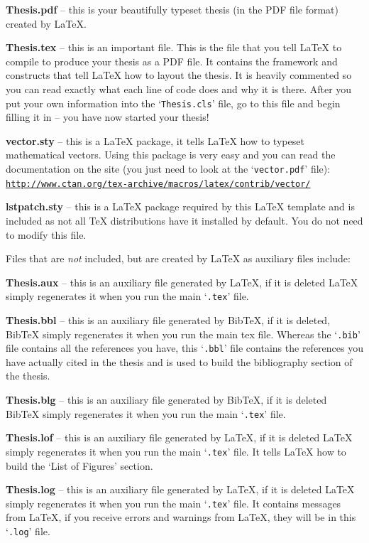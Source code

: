 \textbf{Thesis.pdf} -- this is your beautifully typeset thesis (in the PDF file format) created by \LaTeX{}.

\textbf{Thesis.tex} -- this is an important file. This is the file that you tell \LaTeX{} to compile to produce your thesis as a PDF file. It contains the framework and constructs that tell \LaTeX{} how to layout the thesis. It is heavily commented so you can read exactly what each line of code does and why it is there. After you put your own information into the `\texttt{Thesis.cls}' file, go to this file and begin filling it in -- you have now started your thesis!

\textbf{vector.sty} -- this is a \LaTeX{} package, it tells \LaTeX{} how to typeset mathematical vectors. Using this package is very easy and you can read the documentation on the site (you just need to look at the `\texttt{vector.pdf}' file):\\
\href{http://www.ctan.org/tex-archive/macros/latex/contrib/vector/}{\texttt{http://www.ctan.org/tex-archive/macros/latex/contrib/vector/}}

\textbf{lstpatch.sty} -- this is a \LaTeX{} package required by this LaTeX template and is included as not all \TeX{} distributions have it installed by default. You do not need to modify this file.

Files that are \emph{not} included, but are created by \LaTeX{} as auxiliary files include:

\textbf{Thesis.aux} -- this is an auxiliary file generated by \LaTeX{}, if it is deleted \LaTeX{} simply regenerates it when you run the main `\texttt{.tex}' file.

\textbf{Thesis.bbl} -- this is an auxiliary file generated by BibTeX, if it is deleted, BibTeX simply regenerates it when you run the main tex file. Whereas the `\texttt{.bib}' file contains all the references you have, this `\texttt{.bbl}' file contains the references you have actually cited in the thesis and is used to build the bibliography section of the thesis.

\textbf{Thesis.blg} -- this is an auxiliary file generated by BibTeX, if it is deleted BibTeX simply regenerates it when you run the main `\texttt{.tex}' file.

\textbf{Thesis.lof} -- this is an auxiliary file generated by \LaTeX{}, if it is deleted \LaTeX{} simply regenerates it when you run the main `\texttt{.tex}' file. It tells \LaTeX{} how to build the `List of Figures' section.

\textbf{Thesis.log} -- this is an auxiliary file generated by \LaTeX{}, if it is deleted \LaTeX{} simply regenerates it when you run the main `\texttt{.tex}' file. It contains messages from \LaTeX{}, if you receive errors and warnings from \LaTeX{}, they will be in this `\texttt{.log}' file.


